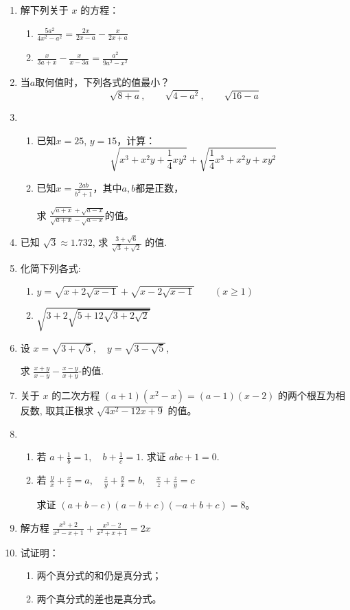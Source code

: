 \begin{enumerate}
\item 解下列关于 $x$ 的方程：
\begin{enumerate}
\item $\frac{5 a^{2}}{4 x^{2}-a^{2}}=\frac{2 x}{2 x-a}-\frac{x}{2 x+a}$
\item $\frac{x}{3 a+x}-\frac{x}{x-3 a}=\frac{a^{2}}{9 a^{2}-x^{2}}$
\end{enumerate}

\item 当$a$取何值时，下列各式的值最小？
\[\sqrt{8+a},\qquad \sqrt{4-a^2},\qquad \sqrt{16-a}  \]

\item \begin{enumerate}
    \item 已知$x=25$, $y=15$，计算：
    \[\sqrt{x^3+x^2y+\frac{1}{4}xy^2}+\sqrt{\frac{1}{4}x^3+x^2y+xy^2} \]
    \item 已知$x=\frac{2ab}{b^2+1}$，其中$a,b$都是正数，
    
    求 $\frac{\sqrt{a+x}+\sqrt{a-x}}{\sqrt{a+x}-\sqrt{a-x}}$的值。
\end{enumerate}

\item 已知 $\sqrt{3} \approx 1.732$, 求 $\frac{3+\sqrt{6}}{\sqrt{3}+\sqrt{2}}$ 的值.
\item 化简下列各式:
\begin{enumerate}
    \item $y=\sqrt{x+2 \sqrt{x-1}}+\sqrt{x-2 \sqrt{x-1}}\qquad (x \geqslant 1)$
    \item $\sqrt{3+2 \sqrt{5+12 \sqrt{3+2 \sqrt{2}}}}$
\end{enumerate}

\item 设 $x=\sqrt{3+\sqrt{5}},\quad  y=\sqrt{3-\sqrt{5}}$,

求 $\frac{x+y}{x-y}-\frac{x-y}{x+y}$-的值.
\item 关于 $x$ 的二次方程 $(a+1)\left(x^{2}-x\right)=(a-1)(x-2)$
的两个根互为相反数, 取其正根求 $\sqrt{4 x^{2}-12 x+9}$ 的值。
\item 
\begin{enumerate}
    \item 若 $a+\frac{1}{b}=1, \quad b+\frac{1}{c}=1$. 求证 $a b c+1=0$.
    \item 若 $\frac{y}{x}+\frac{x}{z}=a,\quad  \frac{z}{y}+\frac{y}{x}=b,\quad  \frac{x}{z}+\frac{z}{y}=c$
    
求证 $(a+b-c)(a-b+c)(-a+b+c)=8$。
\end{enumerate}


\item 解方程 $\frac{x^{3}+2}{x^{2}-x+1}+\frac{x^{3}-2}{x^{2}+x+1}=2 x$
\item 试证明：
\begin{enumerate}
    \item 两个真分式的和仍是真分式；
    \item 两个真分式的差也是真分式。
\end{enumerate}

\end{enumerate}

